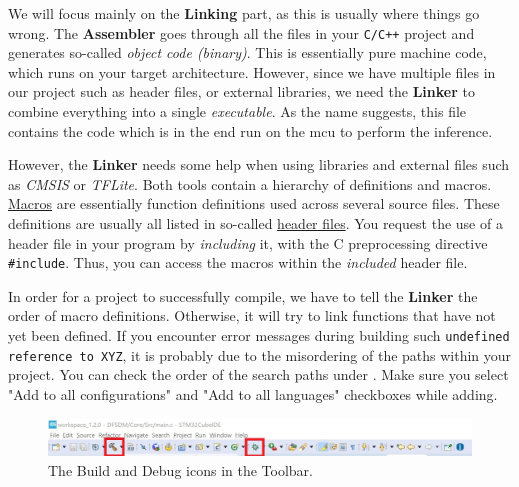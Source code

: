 \documentclass[parskip=half,notes,cadrem,toolver]{iisvlsi}
\begin{document}
We will focus mainly on the \textbf{Linking} part, as this is usually where things go wrong. The \textbf{Assembler} goes through all the files in your \texttt{C/C++} project and generates so-called \textit{object code (binary)}. This is essentially pure machine code, which runs on your target architecture. However, since we have multiple files in our project such as header files, or external libraries, we need the \textbf{Linker} to combine everything into a single \textit{executable}. As the name suggests, this file contains the code which is in the end run on the \gls{mcu} to perform the inference. 

However, the \textbf{Linker} needs some help when using libraries and external files such as \textit{CMSIS} or \textit{TFLite}. Both tools contain a hierarchy of definitions and macros. \href{https://gcc.gnu.org/onlinedocs/cpp/Macros.html#Macros}{Macros} are essentially function definitions used across several source files. These definitions are usually all listed in so-called \href{https://gcc.gnu.org/onlinedocs/cpp/Header-Files.html#:~:text=A%20header%20file%20is%20a,preprocessing%20directive%20'%20%23include%20'.}{header files}. You request the use of a header file in your program by \textit{including} it, with the C preprocessing directive \texttt{\#include}. Thus, you can access the macros within the \textit{included} header file.  

In order for a project to successfully compile, we have to tell the \textbf{Linker} the order of macro definitions. Otherwise, it will try to link functions that have not yet been defined. If you encounter error messages during building such \texttt{undefined reference to XYZ}, it is probably due to the misordering of the paths within your project. You can check the order of the search paths under . Make sure you select "Add to all configurations" and "Add to all languages" checkboxes while adding.


\begin{figure}[H]
    \begin{center}
        \includegraphics[width=\linewidth]{figures/STMCUBEIDEBuild.jpg}
        \caption[The Build and Debug icons in the Toolbar.]{The Build and Debug icons in the Toolbar.}
        \label{fig:STMCUBEIDEBuild}
    \end{center}
\end{figure}
\end{document}
